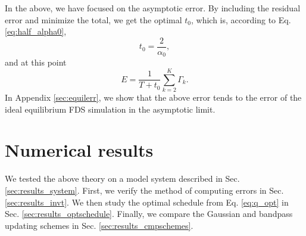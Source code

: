 \documentclass[reprint, floatfix]{revtex4-1}
\begin{document}
In the above, we have focused on
the asymptotic error.
%
By including the residual error
and minimize the total,
we get the optimal $t_0$,
which is, according to Eq. \eqref{eq:half_alpha0},
%
%
\begin{equation}
  t_0
  =
  \frac{     2    }
       { \alpha_0 }
  ,
\label{eq:t0_sinc}
\end{equation}
%
and at this point
%
\begin{equation}
  E
  =
  \frac{   1     }
       { T + t_0 }
  \sum_{ k = 2 }^K
    \Gamma_k
  .
\label{eq:error_sinc}
\end{equation}
%
In Appendix \ref{sec:equilerr},
we show that the above error tends
to the error of the ideal equilibrium FDS simulation
in the asymptotic limit.





%
%




\section{\label{sec:results}
Numerical results}



We tested the above theory on a model system
described in Sec. \ref{sec:results_system}.
%
First, we verify the method of computing errors
in Sec. \ref{sec:results_invt}.
%
We then study the optimal schedule from
Eq. \eqref{eq:q_opt}
in Sec. \ref{sec:results_optschedule}.
%
Finally, we compare the Gaussian and
bandpass updating schemes %
in Sec. \ref{sec:results_cmpschemes}.
\end{document}
